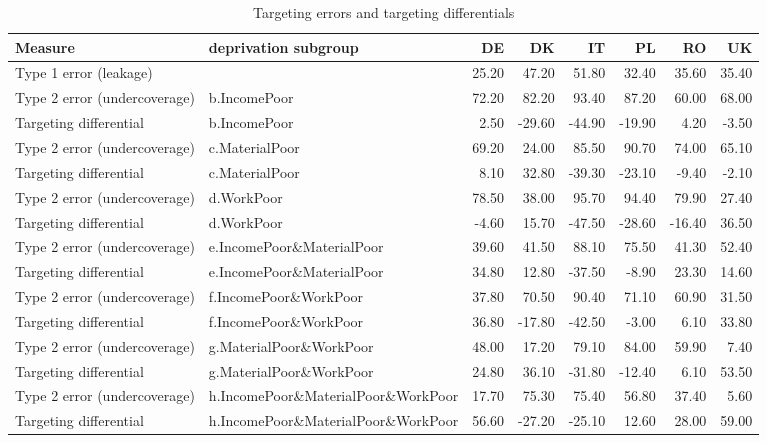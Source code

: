 \documentclass[11pt, a4paper]{article}\usepackage{graphicx, color}
\begin{document}
\begin{table}[H]
\begin{center}
\caption{Targeting errors and targeting differentials}
{\scriptsize
\begin{tabular}{llrrrrrr}
  \hline
\textbf{Measure} & \textbf{deprivation subgroup} & \textbf{DE} & \textbf{DK} & \textbf{IT} & \textbf{PL} & \textbf{RO} & \textbf{UK} \\ 
  \hline
\multicolumn{2}{l}{Type 1 error (leakage)} & 25.20 & 47.20 & 51.80 & 32.40 & 35.60 & 35.40 \\ 
  Type 2 error (undercoverage) & b.IncomePoor & 72.20 & 82.20 & 93.40 & 87.20 & 60.00 & 68.00 \\ 
  Targeting differential & b.IncomePoor & 2.50 & -29.60 & -44.90 & -19.90 & 4.20 & -3.50 \\ 
  Type 2 error (undercoverage) & c.MaterialPoor & 69.20 & 24.00 & 85.50 & 90.70 & 74.00 & 65.10 \\ 
  Targeting differential & c.MaterialPoor & 8.10 & 32.80 & -39.30 & -23.10 & -9.40 & -2.10 \\ 
  Type 2 error (undercoverage) & d.WorkPoor & 78.50 & 38.00 & 95.70 & 94.40 & 79.90 & 27.40 \\ 
  Targeting differential & d.WorkPoor & -4.60 & 15.70 & -47.50 & -28.60 & -16.40 & 36.50 \\ 
  Type 2 error (undercoverage) & e.IncomePoor\&MaterialPoor & 39.60 & 41.50 & 88.10 & 75.50 & 41.30 & 52.40 \\ 
  Targeting differential & e.IncomePoor\&MaterialPoor & 34.80 & 12.80 & -37.50 & -8.90 & 23.30 & 14.60 \\ 
  Type 2 error (undercoverage) & f.IncomePoor\&WorkPoor & 37.80 & 70.50 & 90.40 & 71.10 & 60.90 & 31.50 \\ 
  Targeting differential & f.IncomePoor\&WorkPoor & 36.80 & -17.80 & -42.50 & -3.00 & 6.10 & 33.80 \\ 
  Type 2 error (undercoverage) & g.MaterialPoor\&WorkPoor & 48.00 & 17.20 & 79.10 & 84.00 & 59.90 & 7.40 \\ 
  Targeting differential & g.MaterialPoor\&WorkPoor & 24.80 & 36.10 & -31.80 & -12.40 & 6.10 & 53.50 \\ 
  Type 2 error (undercoverage) & h.IncomePoor\&MaterialPoor\&WorkPoor & 17.70 & 75.30 & 75.40 & 56.80 & 37.40 & 5.60 \\ 
  Targeting differential & h.IncomePoor\&MaterialPoor\&WorkPoor & 56.60 & -27.20 & -25.10 & 12.60 & 28.00 & 59.00 \\ 
   \hline
\end{tabular}
}
\end{center}
\end{table}
\end{document}
